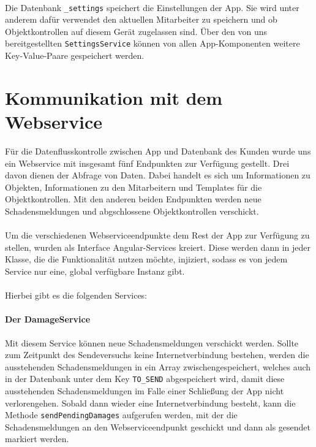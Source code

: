\documentclass[12pt]{article}
\begin{document}
\paragraph{}Die Datenbank \texttt{\_settings} speichert die Einstellungen der App. Sie wird unter anderem dafür verwendet den aktuellen Mitarbeiter zu speichern und ob Objektkontrollen auf diesem Gerät zugelassen sind. Über den von uns bereitgestellten \texttt{SettingsService} können von allen App-Komponenten weitere Key-Value-Paare gespeichert werden.

\section{Kommunikation mit dem Webservice}
Für die Datenflusskontrolle zwischen App und Datenbank des Kunden wurde uns ein Webservice mit insgesamt fünf Endpunkten zur Verfügung gestellt. Drei davon dienen der Abfrage von Daten. Dabei handelt es sich um Informationen zu Objekten, Informationen zu den Mitarbeitern und Templates für die Objektkontrollen. Mit den anderen beiden Endpunkten werden neue Schadensmeldungen und abgschlossene Objektkontrollen verschickt.

\paragraph{}Um die verschiedenen Webserviceendpunkte dem Rest der App zur Verfügung zu stellen, wurden als Interface Angular-Services kreiert. Diese werden dann in jeder Klasse, die die Funktionalität nutzen möchte, injiziert, sodass es von jedem Service nur eine, global verfügbare Instanz gibt.\\ \ \\
Hierbei gibt es die folgenden Services:
\paragraph{Der DamageService}
Mit diesem Service können neue Schadensmeldungen verschickt werden. Sollte zum Zeitpunkt des Sendeversuchs keine Internetverbindung bestehen, werden die ausstehenden Schadensmeldungen in ein Array zwischengespeichert, welches auch in der Datenbank unter dem Key \texttt{TO\_SEND} abgespeichert wird, damit diese ausstehenden Schadensmeldungen im Falle einer Schließung der App nicht verlorengehen. Sobald dann wieder eine Internetverbindung besteht, kann die Methode \texttt{sendPendingDamages} aufgerufen werden, mit der die Schadensmeldungen an den Webserviceendpunkt geschickt und dann als gesendet markiert werden.
\end{document}
